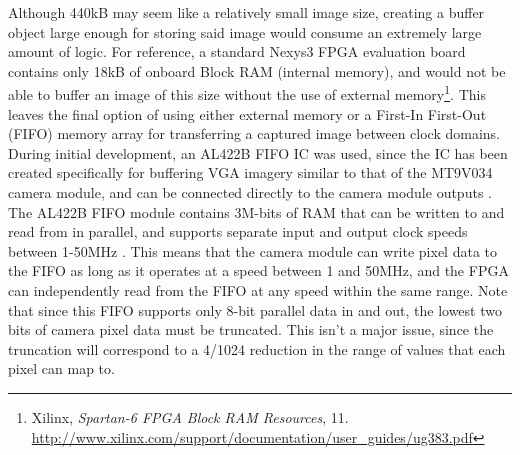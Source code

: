 Although 440kB may seem like a relatively small image size, creating a buffer object large enough for storing said image would consume an extremely large amount of logic. For reference, a standard Nexys3 FPGA evaluation board contains only 18kB of onboard Block RAM (internal memory), and would not be able to buffer an image of this size without the use of external memory\footnote{Xilinx, \textit{Spartan-6 FPGA Block RAM Resources}, 11.\\  \url{http://www.xilinx.com/support/documentation/user_guides/ug383.pdf}}. This leaves the final option of using either external memory or a First-In First-Out (FIFO) memory array for transferring a captured image between clock domains. During initial development, an AL422B FIFO IC was used, since the IC has been created specifically for buffering VGA imagery similar to that of the MT9V034 camera module, and can be connected directly to the camera module outputs \cite{al422b}. The AL422B FIFO module contains 3M-bits of RAM that can be written to and read from in parallel, and supports separate input and output clock speeds between 1-50MHz \cite{al422b}. This means that the camera module can write pixel data to the FIFO as long as it operates at a speed between 1 and 50MHz, and the FPGA can independently read from the FIFO at any speed within the same range. Note that since this FIFO supports only 8-bit parallel data in and out, the lowest two bits of camera pixel data must be truncated. This isn't a major issue, since the truncation will correspond to a 4/1024 reduction in the range of values that each pixel can map to.